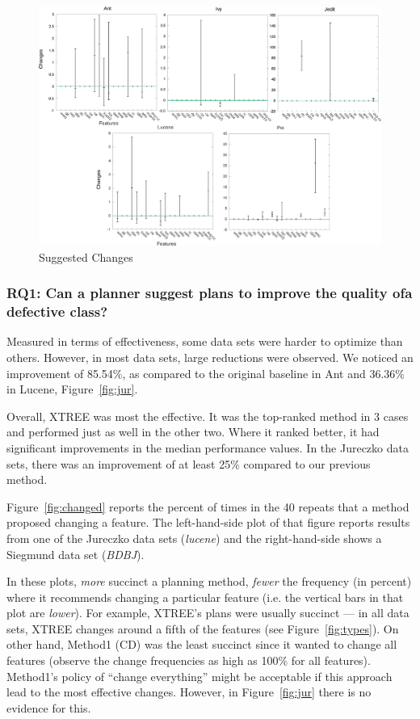 \documentclass{sig-alternate}
\newcommand{\fig}[1]{Figure~\ref{fig:#1}}
\begin{document}
\begin{figure}[!y]
\centering
\includegraphics[width=0.90\linewidth]{figs/changes0.png}
\caption{Suggested Changes}
\label{figs:changes}
\end{figure}

\subsubsection{RQ1: Can a planner suggest plans to improve the quality ofa defective class?}

Measured in terms of effectiveness, some data sets were harder to optimize than others. However, in most data sets, large reductions were observed. We noticed an improvement of 85.54\%, as compared to the original baseline in Ant and 36.36\% in Lucene, \fig{jur}.

Overall, XTREE was most the effective. It was the top-ranked method in 3 cases and performed just as well in the other two. Where it ranked better, it had significant improvements in the median performance values. In the Jureczko data sets, there was an improvement of at least 25\% compared to our previous method.

\fig{changed} reports the percent of times in the 40 repeats that a method proposed changing a feature. The left-hand-side plot of that figure reports results from one of the Jureczko data sets ({\em lucene}) and the right-hand-side shows a Siegmund data set ({\em BDBJ}). 

In these plots, {\em more} succinct a planning method, {\em fewer} the frequency (in percent) where it recommends changing a particular feature (i.e. the vertical bars in that plot are {\em lower}). For example, XTREE's plans were usually succinct --- in all  data sets, XTREE   changes around a fifth of the features (see \fig{types}). On other hand,  Method1 (CD) was the least succinct  since it  wanted to change all features (observe the change frequencies as high as 100\% for all features). Method1's policy of ``change everything''  might be acceptable if this approach lead to the most effective changes. However, in \fig{jur} there is no evidence for this.  
 
\end{document}
